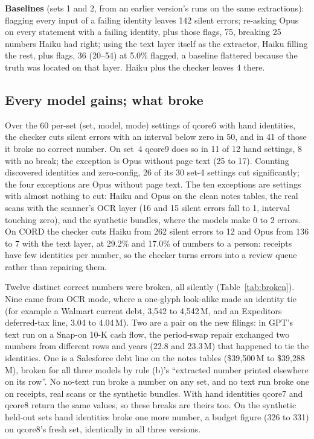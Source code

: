 \documentclass[10pt,twocolumn]{article}
\newcommand{\vq}[1]{\textsf{qcore#1}}
\begin{document}
\textbf{Baselines} (sets 1 and 2, from an earlier version's runs on the same extractions): flagging every input of a failing identity leaves 142 silent errors; re-asking Opus on every statement with a failing identity, plus those flags, 75, breaking 25 numbers Haiku had right; using the text layer itself as the extractor, Haiku filling the rest, plus flags, 36 (20--54) at 5.0\% flagged, a baseline flattered because the truth was located on that layer. Haiku plus the checker leaves 4 there.



\subsection{Every model gains; what broke}\label{sec:allmodels}
Over the 60 per-set (set, model, mode) settings of \vq{6} with hand identities, the checker cuts silent errors with an interval below zero in 50, and in 41 of those it broke no correct number. On set~4 \vq{9} does so in 11 of 12 hand settings, 8 with no break; the exception is Opus without page text (25 to 17). Counting discovered identities and zero-config, 26 of its 30 set-4 settings cut significantly; the four exceptions are Opus without page text. The ten exceptions are settings with almost nothing to cut: Haiku and Opus on the clean notes tables, the real scans with the scanner's OCR layer (16 and 15 silent errors fall to 1, interval touching zero), and the synthetic bundles, where the models make 0 to 2 errors. On CORD the checker cuts Haiku from 262 silent errors to 12 and Opus from 136 to 7 with the text layer, at 29.2\% and 17.0\% of numbers to a person: receipts have few identities per number, so the checker turns errors into a review queue rather than repairing them.

Twelve distinct correct numbers were broken, all silently (Table~\ref{tab:broken}). Nine came from OCR mode, where a one-glyph look-alike made an identity tie (for example a Walmart current debt, 3,542 to 4,542\,M, and an Expeditors deferred-tax line, 3.04 to 4.04\,M). Two are a pair on the new filings: in GPT's text run on a Snap-on 10-K cash flow, the period-swap repair exchanged two numbers from different rows and years (22.8 and 23.3\,M) that happened to tie the identities. One is a Salesforce debt line on the notes tables (\$39,500\,M to \$39,288\,M), broken for all three models by rule (b)'s ``extracted number printed elsewhere on its row''. No no-text run broke a number on any set, and no text run broke one on receipts, real scans or the synthetic bundles. With hand identities \vq{7} and \vq{8} return the same values, so these breaks are theirs too. On the synthetic held-out sets hand identities broke one more number, a budget figure (326 to 331) on \vq{8}'s fresh set, identically in all three versions.
\end{document}
